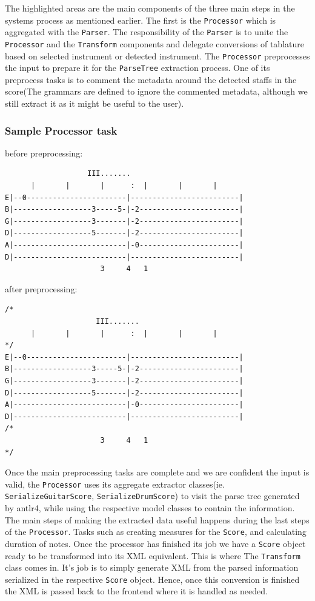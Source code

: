 \documentclass[11pt]{article}
\begin{document}
The highlighted areas are the main components of the three main steps in the systems process as mentioned earlier. The first is the \texttt{Processor} which is aggregated with the \texttt{Parser}. The responsibility of the \texttt{Parser} is to unite the \texttt{Processor} and the \texttt{Transform} components and delegate conversions of tablature based on selected instrument or detected instrument. The \texttt{Processor} preprocesses the input to prepare it for the \texttt{ParseTree} extraction process. One of its preprocess tasks is to comment the metadata around the detected staffs in the score(The grammars are defined to ignore the commented metadata, although we still extract it as it might be useful to the user). 
\subsubsection{Sample Processor task}
\label{sec:org4e6ab32}
before preprocessing:
\begin{verbatim}
	               III.......
	  |       |       |      :  |       |       |
E|--0-----------------------|-------------------------|
B|------------------3-----5-|-2-----------------------|
G|------------------3-------|-2-----------------------|
D|------------------5-------|-2-----------------------|
A|--------------------------|-0-----------------------|
D|--------------------------|-------------------------|
	                  3     4   1
\end{verbatim}

after preprocessing:
\begin{verbatim}
/*
	                 III.......
	  |       |       |      :  |       |       |
*/
E|--0-----------------------|-------------------------|
B|------------------3-----5-|-2-----------------------|
G|------------------3-------|-2-----------------------|
D|------------------5-------|-2-----------------------|
A|--------------------------|-0-----------------------|
D|--------------------------|-------------------------|
/*
	                  3     4   1
*/
\end{verbatim}

Once the main preprocessing tasks are complete and we are confident the input is valid, the \texttt{Processor} uses its aggregate extractor classes(ie. \texttt{SerializeGuitarScore}, \texttt{SerializeDrumScore}) to visit the parse tree generated by antlr4, while using the respective model classes to contain the information. The main steps of making the extracted data useful happens during the last steps of the \texttt{Processor}. Tasks such as creating measures for the \texttt{Score}, and calculating duration of notes. Once the processor has finished its job we have a \texttt{Score} object ready to be transformed into its XML equivalent. This is where The \texttt{Transform} class comes in. It's job is to simply generate XML from the parsed information serialized in the respective \texttt{Score} object. Hence, once this conversion is finished the XML is passed back to the frontend where it is handled as needed.
\end{document}
